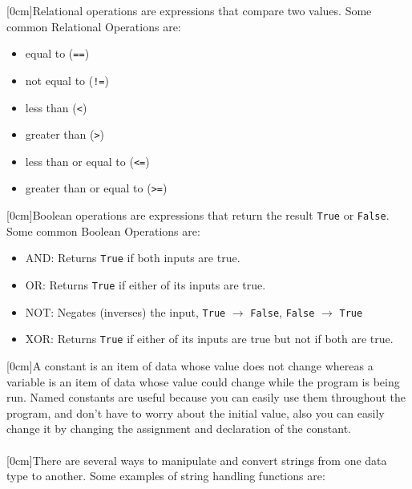 \documentclass[a4paper]{article}
\begin{document}
			[0cm]Relational operations are expressions that compare two values. Some common Relational Operations are:
			\begin{itemize}
				\setlength\itemsep{0em}
				\item equal to (\verb|==|)
				\item not equal to (\verb|!=|)
				\item less than (\verb|<|)
				\item greater than (\verb|>|)
				\item less than or equal to (\verb|<=|)
				\item greater than or equal to (\verb|>=|)
			\end{itemize}
			[0cm]Boolean operations are expressions that return the result \verb|True| or \verb|False|. Some common Boolean Operations are:
			\begin{itemize}
				\setlength\itemsep{0em}
				\item AND: Returns \verb|True| if both inputs are true.
				\item OR: Returns \verb|True| if either of its inputs are true.
				\item NOT: Negates (inverses) the input, \verb|True| $\to$ \verb|False|, \verb|False| $\to$ \verb|True|
				\item XOR: Returns \verb|True| if either of its inputs are true but not if both are true.
			\end{itemize}
			[0cm]A constant is an item of data whose value does not change whereas a variable is an item of data whose value could change while the program is being run. Named constants are useful because you can easily use them throughout the program, and don't have to worry about the initial value, also you can easily change it by changing the assignment and declaration of the constant.\\ \\
			[0cm]There are several ways to manipulate and convert strings from one data type to another. Some examples of string handling functions are:
\end{document}
